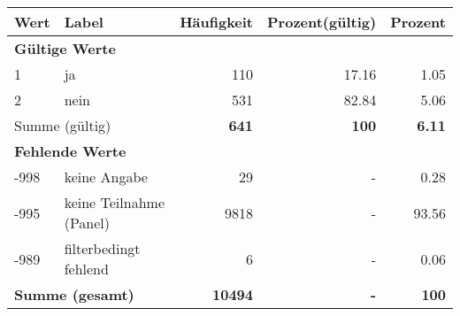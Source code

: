      \begin{longtable}{lXrrr}
     \toprule
     \textbf{Wert} & \textbf{Label} & \textbf{Häufigkeit} & \textbf{Prozent(gültig)} & \textbf{Prozent} \\
     \endhead
     \midrule
     \multicolumn{5}{l}{\textbf{Gültige Werte}}\\

     1 &
     \multicolumn{1}{X}{ ja   } &


       \num{110} &
       \num[round-mode=places,round-precision=2]{17,16} &
         \num[round-mode=places,round-precision=2]{1,05} \\

     2 &
     \multicolumn{1}{X}{ nein   } &


       \num{531} &
       \num[round-mode=places,round-precision=2]{82,84} &
         \num[round-mode=places,round-precision=2]{5,06} \\
     \midrule
     \multicolumn{2}{l}{Summe (gültig)} &
       \textbf{\num{641}} &
     \textbf{100} &
       \textbf{\num[round-mode=places,round-precision=2]{6,11}} \\
     \multicolumn{5}{l}{\textbf{Fehlende Werte}}\\
       -998 &
       keine Angabe &
         \num{29} &
        - &
         \num[round-mode=places,round-precision=2]{0,28} \\
       -995 &
       keine Teilnahme (Panel) &
         \num{9818} &
        - &
         \num[round-mode=places,round-precision=2]{93,56} \\
       -989 &
       filterbedingt fehlend &
         \num{6} &
        - &
         \num[round-mode=places,round-precision=2]{0,06} \\
     \midrule
     \multicolumn{2}{l}{\textbf{Summe (gesamt)}} &
          \textbf{\num{10494}} &
        \textbf{-} &
        \textbf{100} \\
     \bottomrule
     \end{longtable}
     
